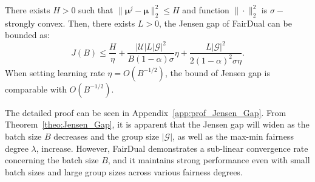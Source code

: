 \begin{theorem}\label{theo:Jensen_Gap}
There exists $H>0$ such that $\|\bm{\mu}^j-\bm{\mu}\|_2^2\leq H$ and function $\|\cdot\|_2^2$ is $\sigma-$strongly convex. 
Then, there exists $L>0$, the Jensen gap of FairDual can be bounded as:
\begin{equation}
    J(B) \leq \frac{H}{\eta} + \frac{|\mathcal{U}|L|\mathcal{G}|^2}{B(1-\alpha)\sigma}\eta + \frac{L|\mathcal{G}|^2}{2(1-\alpha)^2\sigma\eta}.
\end{equation}
When setting learning rate $\eta=O(B^{-1/2})$, the bound of Jensen gap is comparable with $O(B^{-1/2})$.
\end{theorem}
The detailed proof can be seen in Appendix~\ref{app:prof_Jensen_Gap}. From Theorem~\ref{theo:Jensen_Gap}, it is apparent that the Jensen gap will widen as the batch size $B$ decreases and the group size $|\mathcal{G}|$, as well as the max-min fairness degree $\lambda$, increase. However, FairDual demonstrates a sub-linear convergence rate concerning the batch size $B$, and it maintains strong performance even with small batch sizes and large group sizes across various fairness degrees.



